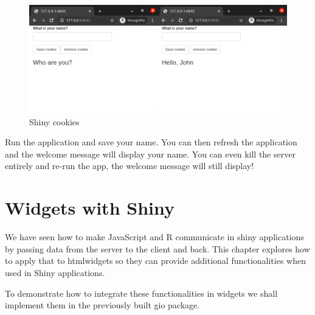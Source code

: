 \documentclass[
]{krantz}
\makeatletter
\newenvironment{Shaded}{\begin{snugshade}}{\end{snugshade}}
\newcommand{\CommentTok}[1]{\textcolor[rgb]{0.37,0.37,0.37}{\textit{#1}}}
\newcommand{\ControlFlowTok}[1]{\textcolor[rgb]{0.27,0.27,0.27}{\textbf{#1}}}
\newcommand{\KeywordTok}[1]{\textcolor[rgb]{0.27,0.27,0.27}{\textbf{#1}}}
\newcommand{\NormalTok}[1]{#1}
\newcommand{\OperatorTok}[1]{\textcolor[rgb]{0.43,0.43,0.43}{\textbf{#1}}}
\newcommand{\StringTok}[1]{\textcolor[rgb]{0.5,0.5,0.5}{#1}}
\newenvironment{kframe}{%
\medskip{}
\setlength{\fboxsep}{.8em}
 \def\at@end@of@kframe{}%
 \ifinner\ifhmode%
  \def\at@end@of@kframe{\end{minipage}}%
  \begin{minipage}{\columnwidth}%
 \fi\fi%
 \def\FrameCommand##1{\hskip\@totalleftmargin \hskip-\fboxsep
 \colorbox{shadecolor}{##1}\hskip-\fboxsep
     \hskip-\linewidth \hskip-\@totalleftmargin \hskip\columnwidth}%
 \MakeFramed {\advance\hsize-\width
   \@totalleftmargin\z@ \linewidth\hsize
   \@setminipage}}%
 {\par\unskip\endMakeFramed%
 \at@end@of@kframe}
\renewenvironment{Shaded}{\begin{kframe}}{\end{kframe}}
\makeatother
\begin{document}
\begin{Shaded}
\end{Shaded}

\begin{figure}
\centering
\includegraphics{images/shiny-cookies-2.png}
\caption{Shiny cookies}
\end{figure}

Run the application and save your name. You can then refresh the application and the welcome message will display your name. You can even kill the server entirely and re-run the app, the welcome message will still display!

\hypertarget{widgets-with-shiny}{%
\chapter{Widgets with Shiny}\label{widgets-with-shiny}}

We have seen how to make JavaScript and R communicate in shiny applications by passing data from the server to the client and back. This chapter explores how to apply that to htmlwidgets so they can provide additional functionalities when used in Shiny applications.

To demonstrate how to integrate these functionalities in widgets we shall implement them in the previously built gio package.
\end{document}
